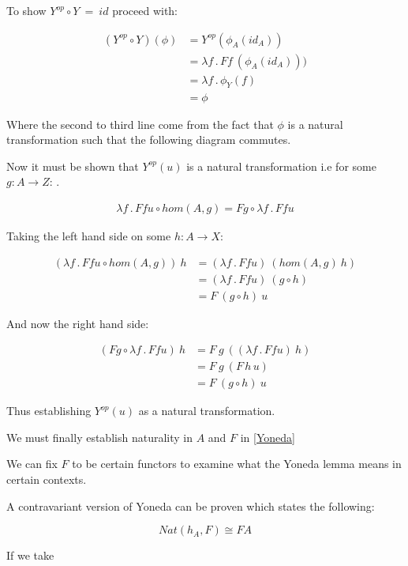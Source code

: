 \documentclass[a4paper,12pt]{article}
\begin{document}
To show $Y^{op} \circ Y \ = \ id$ proceed with:

\begin{align*}
    (Y^{op} \circ Y) (\phi) &= Y^{op} (\phi_{A}(id_{A})) \\
    &= \lambda f \, . \, F f \ (\phi_{A}( id_{A}))) \\
    &= \lambda f \, . \, \phi_{Y}(f) \\
    &= \phi
\end{align*}


Where the second to third line come from the fact that $\phi$ is a natural
transformation such that the following diagram commutes.


Now it must be shown that $Y^{op}(u)$ is a natural transformation i.e for some
$g: A \rightarrow Z$: .

\begin{align*}
    \lambda f \, . \, F f u  \circ hom(A, g) = F g \circ \lambda f \, . \, F f u
\end{align*}

Taking the left hand side on some $h: A \rightarrow X$:

\begin{align*}
    (\lambda f \, . \, F f u  \circ hom(A, g)) \ h &= (\lambda f \, . \, F f u) \ (
    hom(A, g) \ h) \\
    &= (\lambda f \, . \, F f u) \ (g \circ h) \\
    &=  F \ (g \circ h) \ u
\end{align*}

And now the right hand side:

\begin{align*}
    (F g \circ \lambda f \, . \, F f u) \ h &= F \ g \ ( (\lambda f \, . \, F f
        u) \
    h) \\
    &= F \ g \ (F \, h \, u) \\
    &= F \ (g \circ h) \ u
\end{align*}

Thus establishing $Y^{op}(u)$ as a natural transformation.

We must finally establish naturality in $A$ and $F$ in \ref{Yoneda}


We can fix $F$ to be certain functors to examine what the Yoneda lemma means in
certain contexts.

A contravariant version of Yoneda can be proven which states the following:

\begin{equation}
    Nat(h_{A}, F) \cong FA
    \label{Yoneda}
\end{equation}

If we take
\end{document}
